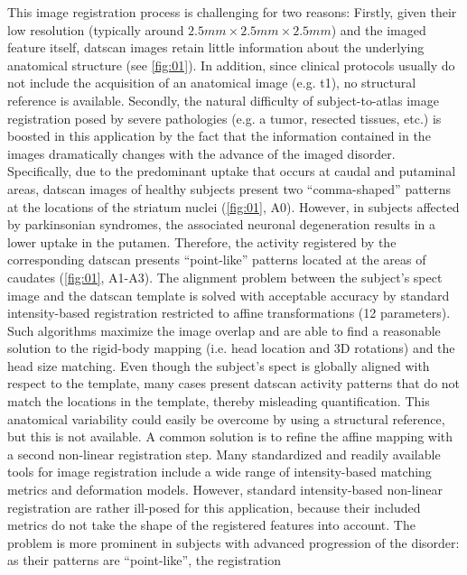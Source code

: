 \documentclass{frontiers}
\begin{document}
This image registration process is challenging for two reasons:
Firstly, given their low resolution  (typically around $2.5mm\times2.5mm\times2.5mm$)
  and the imaged feature itself, \gls*{datscan} images retain little information about the
  underlying anatomical structure  (see \autoref{fig:01}). 
In addition, since clinical protocols usually do not include the acquisition
  of an anatomical image (e.g. \gls*{t1}), 
  no structural reference is available.
Secondly, the natural difficulty of subject-to-atlas image registration
  posed by severe pathologies (e.g. a tumor, resected tissues, etc.) 
  is boosted in this application by the fact that the information 
  contained in the images dramatically changes with the advance of
  the imaged disorder.
Specifically, due to the predominant uptake that occurs at caudal and putaminal areas,
  \gls*{datscan} images of healthy subjects present two
  ``comma-shaped'' patterns at the locations of the striatum nuclei
  (\autoref{fig:01}, A0).
  However, in subjects affected by parkinsonian syndromes, the associated
  neuronal degeneration results in a lower uptake in the putamen.
Therefore, the activity registered by the corresponding \gls*{datscan} presents
  ``point-like'' patterns located at the areas of caudates (\autoref{fig:01}, A1-A3).
The alignment problem between the subject's \gls*{spect} image and the
  \gls*{datscan} template is solved with acceptable accuracy by standard
  intensity-based registration restricted to affine transformations (12 parameters).
Such algorithms maximize the image overlap and are able to find a reasonable solution
  to the rigid-body mapping (i.e. head location and 3D rotations) and the head size matching.
Even though the subject's \gls*{spect} is globally aligned with respect to the
  template, many cases present \gls*{datscan} activity patterns that do
  not match the locations in the template, thereby misleading quantification.
This anatomical variability could easily be overcome by using a structural
  reference, but this is not available.
A common solution is to refine the affine mapping with a second
  non-linear registration step. 
Many standardized and readily available tools for image registration include a wide range 
  of intensity-based matching metrics  and deformation models.
However, standard intensity-based non-linear registration are rather ill-posed for 
  this application, because their included metrics do not take the shape of the registered
  features into account. 
The problem is more prominent in subjects with advanced progression of
  the disorder: as their patterns are ``point-like'', the registration
\end{document}
